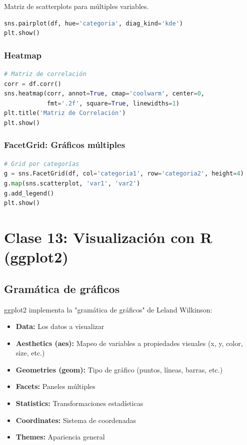 \documentclass[a4paper,11pt]{article}
\begin{document}
Matriz de scatterplots para múltiples variables.

\begin{lstlisting}[language=Python]
sns.pairplot(df, hue='categoria', diag_kind='kde')
plt.show()
\end{lstlisting}

\subsubsection{Heatmap}

\begin{lstlisting}[language=Python]
# Matriz de correlación
corr = df.corr()
sns.heatmap(corr, annot=True, cmap='coolwarm', center=0, 
            fmt='.2f', square=True, linewidths=1)
plt.title('Matriz de Correlación')
plt.show()
\end{lstlisting}

\subsubsection{FacetGrid: Gráficos múltiples}

\begin{lstlisting}[language=Python]
# Grid por categorías
g = sns.FacetGrid(df, col='categoria1', row='categoria2', height=4)
g.map(sns.scatterplot, 'var1', 'var2')
g.add_legend()
plt.show()
\end{lstlisting}

\section{Clase 13: Visualización con R (ggplot2)}

\subsection{Gramática de gráficos}

ggplot2 implementa la "gramática de gráficos" de Leland Wilkinson:

\begin{itemize}
    \item \textbf{Data:} Los datos a visualizar
    \item \textbf{Aesthetics (aes):} Mapeo de variables a propiedades visuales (x, y, color, size, etc.)
    \item \textbf{Geometries (geom):} Tipo de gráfico (puntos, líneas, barras, etc.)
    \item \textbf{Facets:} Paneles múltiples
    \item \textbf{Statistics:} Transformaciones estadísticas
    \item \textbf{Coordinates:} Sistema de coordenadas
    \item \textbf{Themes:} Apariencia general
\end{itemize}
\end{document}
